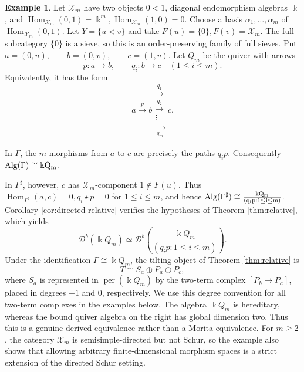 \documentclass[12pt,a4paper,english,reqno]{amsart}
\theoremstyle{plain}
\theoremstyle{definition}
\newtheorem{exm}[theorem]{Example}
\newcommand{\kk}{\Bbbk}
\newcommand{\perf}{\operatorname{per}}
\newcommand{\Hom}{\operatorname{Hom}}
\newcommand{\X}{\mathcal X}
\newcommand{\G}{\Gamma}
\newcommand{\Gs}{\Gamma^{\sharp}}
\newcommand{\Db}[1]{{\mathscr D}^b(#1)}
\newcommand{\Alg}{\rm Alg}
\begin{document}
\begin{exm}
\label{ex:multiple-arrows}
Let $\X_m$ have two objects $0<1$, diagonal endomorphism algebras
$\kk$, and $\Hom_{\X_m}(0,1)=\kk^m,\Hom_{\X_m}(1,0)=0$.
Choose a basis $\alpha_1,\ldots,\alpha_m$ of
$\Hom_{\X_m}(0,1)$.  Let $Y=\{u<v\}$ and take $F(u)=\{0\},F(v)=\X_m$.
The full subcategory $\{0\}$ is a sieve, so this is an order-preserving
family of full sieves.  Put $a=(0,u),\qquad b=(0,v),\qquad c=(1,v)$.
Let $Q_m$ be the quiver with arrows
\[
 p:a\longrightarrow b,
 \qquad
 q_i:b\longrightarrow c\quad(1\leq i\leq m).
\]
Equivalently, it has the form
\[
 a\xrightarrow{\ p\ }b
 \mathrel{\substack{
   \xrightarrow{\ q_1\ }\\[-2pt]
   \xrightarrow{\ q_2\ }\\[-3pt]
   \vdots\\[-3pt]
   \xrightarrow[\ q_m\ ]{}
 }}c.
\]


In $\G$, the $m$ morphisms from $a$ to $c$ are precisely the paths
$q_i p$.  Consequently $\Alg(\G)\cong \kk Q_m$.

In $\Gs$, however, $c$ has $\X_m$-component $1\notin F(u)$.  Thus $\Hom_{\Gs}(a,c)=0,
 q_i\star p=0$ for $1\leq i\leq m$,
and hence $\Alg(\Gs)\cong
\frac{\kk Q_m}{(q_i p:1\leq i\leq m)}$.
Corollary \ref{cor:directed-relative} verifies the hypotheses of
Theorem \ref{thm:relative}, which yields
\[
 \Db{\kk Q_m}
 \simeq
 \Db{\frac{\kk Q_m}{(q_i p:1\leq i\leq m)}}.
\]
Under the identification $\G\cong\kk Q_m$, the tilting object of
Theorem \ref{thm:relative} is
\[
 T\cong S_a\oplus P_a\oplus P_c,
\]
where $S_a$ is represented in $\perf(\kk Q_m)$ by the two-term complex
$[P_b\to P_a]$, placed in degrees $-1$ and $0$, respectively.  We use
this degree convention for all two-term complexes in the examples below.
The algebra $\kk Q_m$ is hereditary, whereas the bound
quiver algebra on the right has global dimension two.  Thus this is a
genuine derived equivalence rather than a Morita equivalence.  For
$m\geq2$, the category $\X_m$ is semisimple-directed but not Schur, so the
example also shows that allowing arbitrary finite-dimensional morphism
spaces is a strict extension of the directed Schur setting.
\end{exm}
\end{document}
